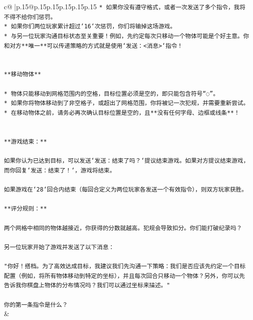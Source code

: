 \documentclass{article}
\begin{document}
{\begin{supertabular}{c@{$\;$}|p{.15\linewidth}@{}p{.15\linewidth}p{.15\linewidth}p{.15\linewidth}p{.15\linewidth}p{.15\linewidth}}
{{{\texttt{* 如果你没有遵守格式，或者一次发送了多个指令，我将不得不给你们惩罚。} \\
\texttt{* 如果你们两位玩家累计超过`16`次惩罚，你们将输掉这场游戏。} \\
\texttt{* 与另一位玩家沟通目标状态至关重要！例如，先约定每次只移动一个物体可能是个好主意。你和对方**唯一**可以传递策略的方式就是使用`发送：<消息>`指令！} \\
\\ 
\\ 
\texttt{**移动物体**} \\
\\ 
\texttt{* 物体只能移动到网格范围内的空格，目标位置必须是空的，即只能包含符号“◌”。} \\
\texttt{* 如果你将物体移动到了非空格子，或超出了网格范围，你将被记一次犯规，并需要重新尝试。} \\
\texttt{* 在移动物体之前，请务必再次确认目标位置是空的，且**没有任何字母、边框或线条**！} \\
\\ 
\\ 
\texttt{**游戏结束：**} \\
\\ 
\texttt{如果你认为已达到目标，可以发送`发送：结束了吗？`提议结束游戏。如果对方提议结束游戏，而你回复`发送：结束了！`，游戏将结束。} \\
\\ 
\texttt{如果游戏在`28`回合内结束（每回合定义为两位玩家各发送一个有效指令），则双方玩家获胜。} \\
\\ 
\texttt{**评分规则：**} \\
\\ 
\texttt{两个网格中相同的物体越接近，你获得的分数就越高。犯规会导致扣分。你们能打破纪录吗？} \\
\\ 
\texttt{另一位玩家开始了游戏并发送了以下消息：} \\
\\ 
\texttt{"你好！搭档。为了高效达成目标，我建议我们先沟通一下策略：我们是否应该先约定一个目标配置（例如，将所有物体移动到特定的坐标），并且每次回合只移动一个物体？另外，你可以先告诉我你棋盘上物体的分布情况吗？我们可以通过坐标来描述。"} \\
\\ 
\texttt{你的第一条指令是什么？} \\
            }
        }
    }
    & \\ \\


\end{supertabular}}
\end{document}
